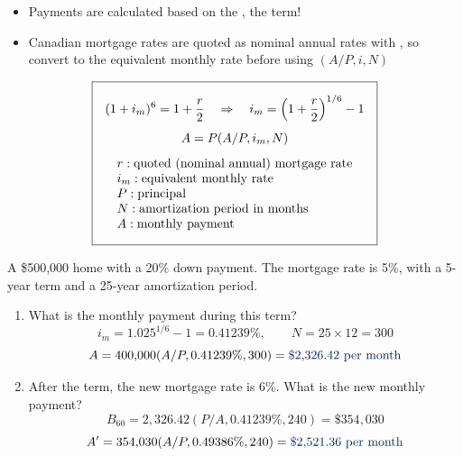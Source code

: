 \begin{remark}
    \leavevmode
    \begin{itemize}
        \item Payments are calculated based on the ,  the term!
        \item Canadian mortgage rates are quoted as nominal annual rates with , so convert to the equivalent monthly rate before using $(A/P,i,N)$
    \end{itemize}
    \[\boxed{\begin{gathered}
        (1+i_m)^6 = 1+\frac{r}{2} \quad\Rightarrow\quad i_m = \left(1+\frac{r}{2}\right)^{1/6} - 1\\[4pt]
        A = P(A/P,i_m,N)\\[4pt]
        \begin{array}{@{}l@{}}
            r: \text{quoted (nominal annual) mortgage rate}\\
            i_m: \text{equivalent monthly rate}\\
            P: \text{principal}\\
            N: \text{amortization period in months}\\
            A: \text{monthly payment}
        \end{array}
    \end{gathered}}\]
\end{remark}

\begin{example}
    A \$500,000 home with a 20\% down payment. The mortgage rate is 5\%,
    with a 5-year term and a 25-year amortization period.
    \begin{enumerate}[label = \alph*)]
        \item What is the monthly payment during this term?
        \\
        \[i_m = 1.025^{1/6} - 1 = 0.41239\%, \qquad N = 25 \times 12 = 300\]
        \[A = 400{,}000(A/P,0.41239\%,300) = \db{\$2{,}326.42 \text{ per month}}\]
        \item After the term, the new mortgage rate is 6\%. What is the new monthly payment?
        \\
        \[B_{60} = 2{,}326.42(P/A,0.41239\%,240) = \$354{,}030\]
        \[A' = 354{,}030(A/P,0.49386\%,240) = \db{\$2{,}521.36 \text{ per month}}\]
    \end{enumerate}
\end{example}

